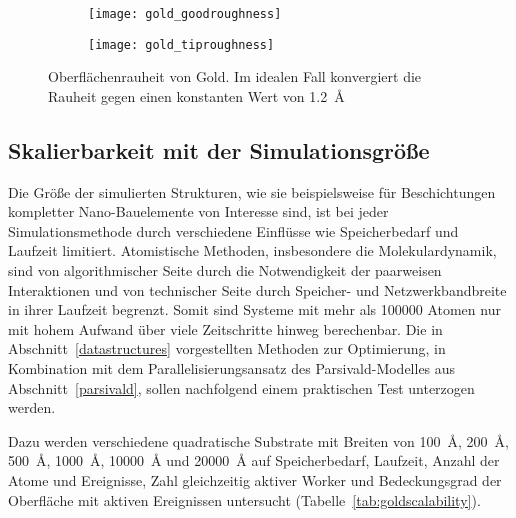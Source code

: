 \begin{figure}
  \captionsetup[subfigure]{singlelinecheck=false}
  \def\subfigwidth{0.49\textwidth}

  \begin{subfigure}[t]{\subfigwidth}
    \texttt{[image: gold\_goodroughness]}
    \label{fig:goldroughness-a}
  \end{subfigure}
  \hfill
  \begin{subfigure}[t]{\subfigwidth}
    \texttt{[image: gold\_tiproughness]}
    \label{fig:goldroughness-b}
  \end{subfigure}

  \caption[Oberflächenrauheit von Gold]{Oberflächenrauheit von Gold.
    Im idealen Fall konvergiert die Rauheit gegen einen konstanten Wert von \SI{1.2}{\angstrom}
  }
  \label{fig:goldroughness}

\end{figure}

\subsection{Skalierbarkeit mit der Simulationsgröße}

Die Größe der simulierten Strukturen, wie sie beispielsweise für Beschichtungen kompletter Nano-Bauelemente von Interesse sind, ist bei jeder Simulationsmethode durch verschiedene Einflüsse wie Speicherbedarf und Laufzeit limitiert.
Atomistische Methoden, insbesondere die Molekulardynamik, sind von algorithmischer Seite durch die Notwendigkeit der paarweisen Interaktionen und von technischer Seite durch Speicher- und Netzwerkbandbreite in ihrer Laufzeit begrenzt.
Somit sind Systeme mit mehr als \num{100000} Atomen nur mit hohem Aufwand über viele Zeitschritte hinweg berechenbar.
Die in Abschnitt~\ref{datastructures} vorgestellten Methoden zur Optimierung, in Kombination mit dem Parallelisierungsansatz des Parsivald-Modelles aus Abschnitt~\ref{parsivald}, sollen nachfolgend einem praktischen Test unterzogen werden.

Dazu werden verschiedene quadratische Substrate mit Breiten von \SI{100}{\angstrom}, \SI{200}{\angstrom}, \SI{500}{\angstrom}, \SI{1000}{\angstrom}, \SI{10000}{\angstrom} und \SI{20000}{\angstrom} auf Speicherbedarf, Laufzeit, Anzahl der Atome und Ereignisse, Zahl gleichzeitig aktiver Worker und Bedeckungsgrad der Oberfläche mit aktiven Ereignissen untersucht (Tabelle~\ref{tab:goldscalability}).

